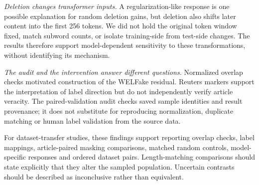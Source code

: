 \emph{Deletion changes transformer inputs.} A regularization-like response is one possible explanation for random deletion gains, but deletion also shifts later content into the first 256 tokens. We did not hold the original token window fixed, match subword counts, or isolate training-side from test-side changes. The results therefore support model-dependent sensitivity to these transformations, without identifying its mechanism.

\emph{The audit and the intervention answer different questions.} Normalized overlap checks motivated construction of the WELFake residual. Reuters markers support the interpretation of label direction but do not independently verify article veracity. The paired-validation audit checks saved sample identities and result provenance; it does not substitute for reproducing normalization, duplicate matching or human label validation from the source data.

For dataset-transfer studies, these findings support reporting overlap checks, label mappings, article-paired masking comparisons, matched random controls, model-specific responses and ordered dataset pairs. Length-matching comparisons should state explicitly that they alter the sampled population. Uncertain contrasts should be described as inconclusive rather than equivalent.
